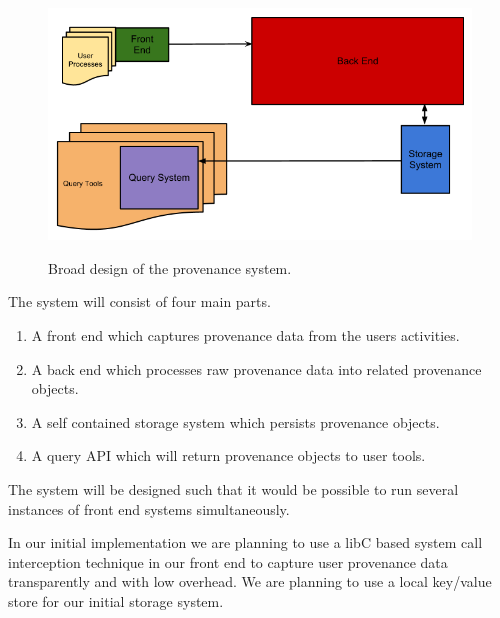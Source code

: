 \begin{figure}
\includegraphics[width=\textwidth]{res/BroadProvDesign.png}
\label{fig:broaddes}
\caption{Broad design of the provenance system.}
\end{figure}
The system will consist of four main parts.
\begin{enumerate}
\item A front end which captures provenance data from the users activities.
\item A back end which processes raw provenance data into related provenance objects.
\item A self contained storage system which persists provenance objects.
\item A query API which will return provenance objects to user tools.
\end{enumerate}
The system will be designed such that it would be possible to run several instances of front end systems simultaneously.

In our initial implementation we are planning to use a libC based system call interception technique in our front end to capture user provenance data transparently and with low overhead. We are planning to use a local key/value store for our initial storage system.
